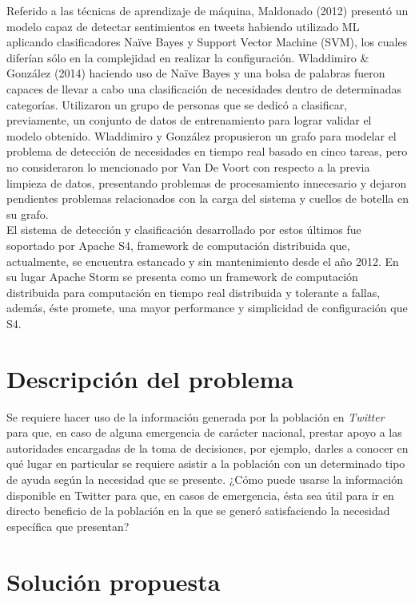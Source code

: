 Referido a las técnicas de aprendizaje de máquina, Maldonado (2012) presentó un modelo capaz de detectar sentimientos en tweets habiendo utilizado ML aplicando clasificadores Naïve Bayes y Support Vector Machine (SVM), los cuales diferían sólo en la complejidad en realizar la configuración. Wladdimiro \& González (2014) haciendo uso de Naïve Bayes y una bolsa de palabras fueron capaces de llevar a cabo una clasificación de necesidades dentro de determinadas categorías. Utilizaron un grupo de personas que se dedicó a clasificar, previamente, un conjunto de datos de entrenamiento para lograr validar el modelo obtenido. Wladdimiro y González propusieron un grafo para modelar el problema de detección de necesidades en tiempo real basado en cinco tareas, pero no consideraron lo mencionado por Van De Voort con respecto a la previa limpieza de datos, presentando problemas de procesamiento innecesario y dejaron pendientes problemas relacionados con la carga del sistema y cuellos de botella en su grafo.\\

El sistema de detección y clasificación desarrollado por estos últimos fue soportado por Apache S4, framework de computación distribuida que, actualmente, se encuentra estancado y sin mantenimiento desde el año 2012. En su lugar Apache Storm se presenta como un framework de computación distribuida para computación en tiempo real distribuida y tolerante a fallas, además, éste promete, una mayor performance y simplicidad de configuración que S4.\\


\section{Descripción del problema}
\label{intro:problema}

Se requiere hacer uso de la información generada por la población en \textit{Twitter} para que, en caso de alguna emergencia de carácter nacional, prestar apoyo a las autoridades encargadas de la toma de decisiones, por ejemplo, darles a conocer en qué lugar en particular se requiere asistir a la población con un determinado tipo de ayuda según la necesidad que se presente. ¿Cómo puede usarse la información disponible en Twitter para que, en casos de emergencia, ésta sea útil para ir en directo beneficio de la población en la que se generó satisfaciendo la necesidad específica que presentan?\\

\section{Solución propuesta}
\label{intro:solucion}

